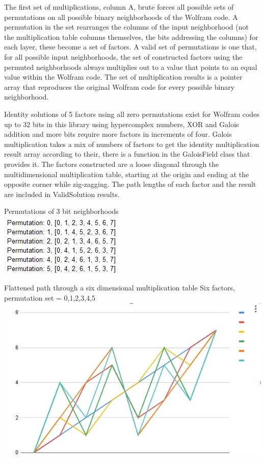 \documentclass[11pt]{article}
\begin{document}
The first set of multiplications, column A, brute forces all possible sets of permutations on all possible binary neighborhoods of the Wolfram code. A permutation in the set rearranges the columns of the input neighborhood (not the multiplication table columns themselves, the bits addressing the columns) for each layer, these become a set of factors.  A valid set of permutations is one that, for all possible input neighborhoods, the set of constructed factors using the permuted neighborhoods always multiplies out to a value that points to an equal value within the Wolfram code. The set of multiplication results is a pointer array that reproduces the original Wolfram code for every possible binary neighborhood. 

Identity solutions of 5 factors using all zero permutations exist for Wolfram codes up to 32 bits in this library using hypercomplex numbers, XOR and Galois addition and more bits require more factors in increments of four. Galois multiplication takes a mix of numbers of factors to get the identity multiplication result array according to their, there is a function in the GaloisField class that provides it. The factors constructed are a loose diagonal through the multidimensional multiplication table, starting at the origin and ending at the opposite corner while zig-zagging. The path lengths of each factor and the result are included in ValidSolution results.

\begin{center}
Permutations of 3 bit neighborhoods\\
\includegraphics{bitPermutations.jpg}

Flattened path through a six dimensional multiplication table
Six factors, permutation set = {0,1,2,3,4,5}\\
\includegraphics{flattenedSixCube.jpg}
\end{center}
\end{document}
